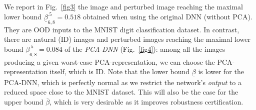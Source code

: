We report in Fig.~\ref{fig3} the image and perturbed image reaching the maximal lower bound $\underline{\beta}^{.5}_{6,8}=0.518$ 
obtained when using the original DNN (without PCA).
They are OOD inputs to the MNIST digit classification dataset.
%
In contrast, there are natural (ID) images and perturbed images 
reaching the maximal lower bound $\underline{\beta}^{.5}_{6,8}=0.084$ 
of the {\em  PCA-DNN} (Fig.~\ref{fig4}): among all the images producing a given worst-case PCA-representation, we can choose the PCA-representation itself, which is ID.
Note that the lower bound $\underline{\beta}$ is lower for the PCA-DNN, which is perfectly normal as we restrict the network's {\em output} to a reduced space close to the MNIST dataset. This will also be the case for the upper bound $\overline{\beta}$, which is very desirable as it improves robustness certification. 

\fi



%
%
